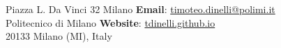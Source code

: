 Piazza L. Da Vinci 32 Milano \hfill \textbf{Email}: \href{mailto:timoteo.dinelli@polimi.it}{timoteo.dinelli@polimi.it}\\
Politecnico di Milano   \hfill \textbf{Website}: \href{https://tdinelli.github.io}{tdinelli.github.io}\\
20133 Milano (MI), Italy  \hfill %
